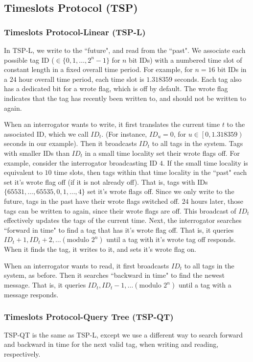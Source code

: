 \documentclass[conference]{IEEEtran}
\begin{document}
\subsection{Timeslots Protocol (TSP)}
\subsubsection{Timeslots Protocol-Linear (TSP-L)}
In TSP-L, we write to the ``future", and read from the ``past".  We associate each possible tag ID ($\in \{0, 1, \ldots, 2^n-1\}$ for $n$ bit IDs) with a numbered time slot of constant length in a fixed overall time period.  For example, for $n = 16$ bit IDs in a $24$ hour overall time period, each time slot is $1.318359$ seconds.  Each tag also has a dedicated bit for a wrote flag, which is off by default.  The wrote flag indicates that the tag has recently been written to, and should not be written to again.

When an interrogator wants to write, it first translates the current time $t$ to the associated ID, which we call $ID_t$.  (For instance, $ID_u = 0$, for $u \in \left[0, 1.318359\right)$ seconds in our example).  Then it broadcasts $ID_t$ to all tags in the system.  Tags with smaller IDs than $ID_t$ in a small time locality set their wrote flags off.  For example, consider the interrogator broadcasting ID $4$.  If the small time locality is equivalent to $10$ time slots, then tags within that time locality in the ``past" each set it's wrote flag off (if it is not already off).  That is, tags with IDs $\{65531, \ldots, 65535, 0, 1, \ldots, 4\}$ set it's wrote flags off.  Since we only write to the future, tags in the past have their wrote flags switched off.  $24$ hours later, those tags can be written to again, since their wrote flags are off.  This broadcast of $ID_t$ effectively updates the tags of the current time.  Next, the interrogator searches ``forward in time" to find a tag that has it's wrote flag off.  That is, it queries $ID_t + 1, ID_t + 2, \ldots (\mbox{modulo } 2^n)$ until a tag with it's wrote tag off responds.  When it finds the tag, it writes to it, and sets it's wrote flag on.

When an interrogator wants to read, it first broadcasts $ID_t$ to all tags in the system, as before.  Then it searches ``backward in time" to find the newest message.  That is, it queries $ID_t, ID_t -1, \ldots (\mbox{modulo } 2^n)$ until a tag with a message responds.

\subsubsection{Timeslots Protocol-Query Tree (TSP-QT)}
TSP-QT is the same as TSP-L, except we use a different way to search forward and backward in time for the next valid tag, when writing and reading, respectively. 
\end{document}
